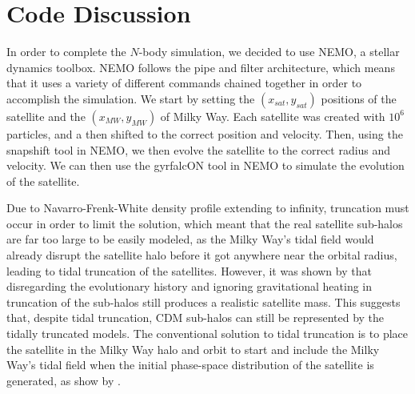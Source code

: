 \documentclass[twocolumn]{article}
\begin{document}
%
%
%
%

\section{Code Discussion}
In order to complete the $N$-body simulation, we decided to use NEMO, a stellar dynamics toolbox. NEMO follows the pipe and filter architecture, which means that it uses a variety of different commands chained together in order to accomplish the simulation. We start by setting the $(x_{sat}, y_{sat})$ positions of the satellite and the $(x_{MW}, y_{MW})$ of Milky Way. Each satellite was created with $10^6$ particles, and a then shifted to the correct position and velocity. Then, using the snapshift tool in NEMO, we then evolve the satellite to the correct radius and velocity. We can then use the gyrfalcON tool in NEMO to simulate the evolution of the satellite.

Due to Navarro-Frenk-White density profile extending to infinity, truncation must occur in order to limit the solution, which meant that the real satellite sub-halos are far too large to be easily modeled, as the Milky Way's tidal field would already disrupt the satellite halo before it got anywhere near the orbital radius, leading to tidal truncation of the satellites. However, it was shown by \cite{truncationOfHalos} that disregarding the evolutionary history and ignoring gravitational heating in truncation of the sub-halos still produces a realistic satellite mass. This suggests that, despite tidal truncation, CDM sub-halos can still be represented by the tidally truncated models. The conventional solution to tidal truncation  is to place the satellite in the Milky Way halo and orbit to start and include the Milky Way's tidal field when the initial phase-space distribution of the satellite is generated, as show by \cite{dynamicsOfTidalTails}.
\end{document}
